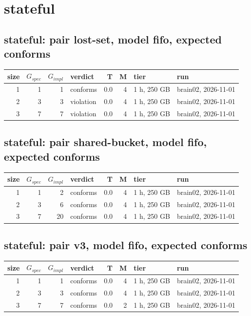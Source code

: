 \documentclass[10pt]{article}
\begin{document}
\section*{stateful}
\subsection*{stateful: pair \textsf{lost-set}, model fifo, expected conforms}
\begin{longtable}{@{}rrrlrrll@{}}
\toprule
size & $G_{\mathit{spec}}$ & $G_{\mathit{impl}}$ & verdict & T & M & tier & run \\
\midrule
\endhead
\color{blue} 1 & 1 & 1 & conforms & 0.0 & 4 & 1 h, 250 GB & brain02, 2026-11-01 \\
\color{blue} 2 & 3 & 3 & violation & 0.0 & 4 & 1 h, 250 GB & brain02, 2026-11-01 \\
\color{blue} 3 & 7 & 7 & violation & 0.0 & 4 & 1 h, 250 GB & brain02, 2026-11-01 \\
\bottomrule
\end{longtable}
\subsection*{stateful: pair \textsf{shared-bucket}, model fifo, expected conforms}
\begin{longtable}{@{}rrrlrrll@{}}
\toprule
size & $G_{\mathit{spec}}$ & $G_{\mathit{impl}}$ & verdict & T & M & tier & run \\
\midrule
\endhead
\color{blue} 1 & 1 & 2 & conforms & 0.0 & 4 & 1 h, 250 GB & brain02, 2026-11-01 \\
\color{blue} 2 & 3 & 6 & conforms & 0.0 & 4 & 1 h, 250 GB & brain02, 2026-11-01 \\
\color{blue} 3 & 7 & 20 & conforms & 0.0 & 4 & 1 h, 250 GB & brain02, 2026-11-01 \\
\bottomrule
\end{longtable}
\subsection*{stateful: pair \textsf{v3}, model fifo, expected conforms}
\begin{longtable}{@{}rrrlrrll@{}}
\toprule
size & $G_{\mathit{spec}}$ & $G_{\mathit{impl}}$ & verdict & T & M & tier & run \\
\midrule
\endhead
\color{blue} 1 & 1 & 1 & conforms & 0.0 & 4 & 1 h, 250 GB & brain02, 2026-11-01 \\
\color{blue} 2 & 3 & 3 & conforms & 0.0 & 4 & 1 h, 250 GB & brain02, 2026-11-01 \\
\color{blue} 3 & 7 & 7 & conforms & 0.0 & 2 & 1 h, 250 GB & brain02, 2026-11-01 \\
\bottomrule
\end{longtable}
\end{document}
